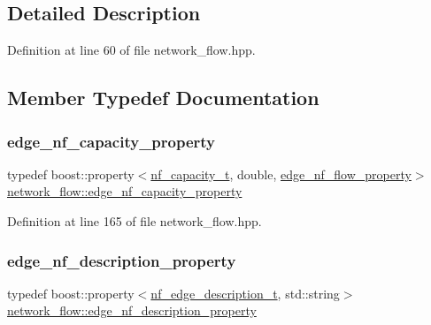 \subsection{Detailed Description}


Definition at line 60 of file network\+\_\+flow.\+hpp.



\subsection{Member Typedef Documentation}
\mbox{\label{classnetwork__flow_a94cd5febfd01e9a9d40fec1ce816632a}} 
\subsubsection{\texorpdfstring{edge\+\_\+nf\+\_\+capacity\+\_\+property}{edge\_nf\_capacity\_property}}
{\footnotesize\ttfamily typedef boost\+::property$<$\hyperlink{structnetwork__flow_1_1nf__capacity__t}{nf\+\_\+capacity\+\_\+t}, double, \hyperlink{classnetwork__flow_a7ff9c3dbfcecece654db838d75aaea91}{edge\+\_\+nf\+\_\+flow\+\_\+property}$>$ \hyperlink{classnetwork__flow_a94cd5febfd01e9a9d40fec1ce816632a}{network\+\_\+flow\+::edge\+\_\+nf\+\_\+capacity\+\_\+property}\hspace{0.3cm}{\ttfamily [private]}}



Definition at line 165 of file network\+\_\+flow.\+hpp.

\mbox{\label{classnetwork__flow_a29cba62261c14130640a9082b9a5d70f}} 
\subsubsection{\texorpdfstring{edge\+\_\+nf\+\_\+description\+\_\+property}{edge\_nf\_description\_property}}
{\footnotesize\ttfamily typedef boost\+::property$<$\hyperlink{structnetwork__flow_1_1nf__edge__description__t}{nf\+\_\+edge\+\_\+description\+\_\+t}, std\+::string$>$ \hyperlink{classnetwork__flow_a29cba62261c14130640a9082b9a5d70f}{network\+\_\+flow\+::edge\+\_\+nf\+\_\+description\+\_\+property}\hspace{0.3cm}{\ttfamily [private]}}



